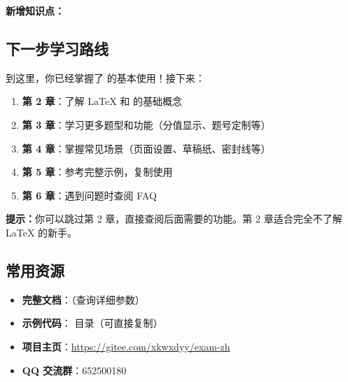 \textbf{新增知识点：}



\subsection{下一步学习路线}

到这里，你已经掌握了  的基本使用！接下来：

\begin{enumerate}
  \item \textbf{第 2 章}：了解 \LaTeX{} 和  的基础概念
  \item \textbf{第 3 章}：学习更多题型和功能（分值显示、题号定制等）
  \item \textbf{第 4 章}：掌握常见场景（页面设置、草稿纸、密封线等）
  \item \textbf{第 5 章}：参考完整示例，复制使用
  \item \textbf{第 6 章}：遇到问题时查阅 FAQ
\end{enumerate}

\textbf{提示：}你可以跳过第 2 章，直接查阅后面需要的功能。第 2 章适合完全不了解 \LaTeX{} 的新手。

\subsection{常用资源}

\begin{itemize}
  \item \textbf{完整文档}：（查询详细参数）
  \item \textbf{示例代码}： 目录（可直接复制）
  \item \textbf{项目主页}：\url{https://gitee.com/xkwxdyy/exam-zh}
  \item \textbf{QQ 交流群}：652500180
\end{itemize}
